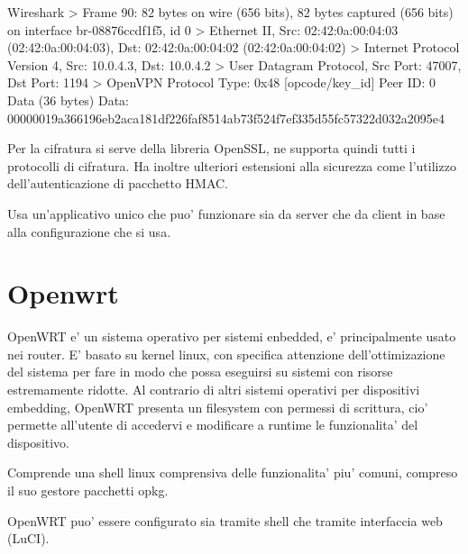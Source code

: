 \begin{bashcode}{Wireshark}{}
> Frame 90: 82 bytes on wire (656 bits), 82 bytes captured (656 bits) on interface br-08876ccdf1f5, id 0
> Ethernet II, Src: 02:42:0a:00:04:03 (02:42:0a:00:04:03), Dst: 02:42:0a:00:04:02 (02:42:0a:00:04:02)
> Internet Protocol Version 4, Src: 10.0.4.3, Dst: 10.0.4.2
> User Datagram Protocol, Src Port: 47007, Dst Port: 1194
> OpenVPN Protocol
        Type: 0x48 [opcode/key_id]
        Peer ID: 0
        Data (36 bytes)
            Data: 00000019a366196eb2aca181df226faf8514ab73f524f7ef335d55fc57322d032a2095e4
\end{bashcode}




Per la cifratura si serve della libreria OpenSSL, ne supporta quindi tutti i protocolli di cifratura. Ha inoltre ulteriori estensioni alla sicurezza come l'utilizzo dell'autenticazione di pacchetto HMAC.


Usa un'applicativo unico che puo' funzionare sia da server che da client in base alla configurazione che si usa.

\section{Openwrt}

OpenWRT e' un sistema operativo per sistemi enbedded, e' principalmente usato nei router. E' basato su kernel linux, con specifica attenzione dell'ottimizazione del sistema per fare in modo che possa eseguirsi su sistemi con risorse estremamente ridotte.
Al contrario di altri sistemi operativi per dispositivi embedding, OpenWRT presenta un filesystem con permessi di scrittura, cio' permette all'utente di accedervi e modificare a runtime le funzionalita' del dispositivo.

Comprende una shell linux comprensiva delle funzionalita' piu' comuni, compreso il suo gestore pacchetti opkg.

OpenWRT puo' essere configurato sia tramite shell che tramite interfaccia web (LuCI).


